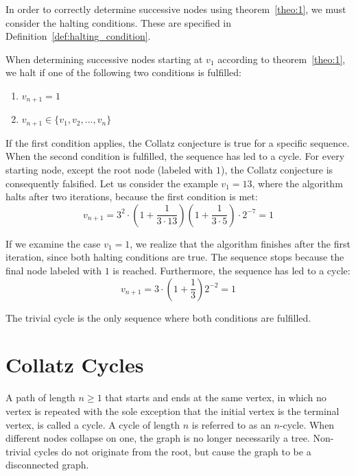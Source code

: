 \documentclass{SciPress_2015}
\begin{document}
In order to correctly determine successive nodes using theorem~\ref{theo:1}, we must consider the halting conditions. These are specified in Definition~\ref{def:halting_condition}.

\begin{definition}
	\label{def:halting_condition}
	When determining successive nodes starting at $v_1$ according to theorem~\ref{theo:1}, we halt if one of the following two conditions is fulfilled:
	\begin{enumerate}
		\item $v_{n+1}=1$
		\item $v_{n+1}\in\{v_1,v_2,\ldots,v_n\}$
	\end{enumerate}
	If the first condition applies, the Collatz conjecture is true for a specific sequence. When the second condition is fulfilled, the sequence has led to a cycle. For every starting node, except the root node (labeled with $1$), the Collatz conjecture is consequently falsified. Let us consider the example $v_1=13$, where the algorithm halts after two iterations, because the first condition is met:
	\[
	v_{n+1}=3^2\cdot\left(1+\frac{1}{3\cdot13}\right)\left(1+\frac{1}{3\cdot5}\right)\cdot2^{-7}=1
	\]
	
	If we examine the case $v_{1}=1$, we realize that the algorithm finishes after the first iteration, since both halting conditions are true. The sequence stops because the final node labeled with $1$ is reached. Furthermore, the sequence has led to a cycle:
	\[
	v_{n+1}=3\cdot\left(1+\frac{1}{3}\right)2^{-2}=1
	\]
	
	The trivial cycle is the only sequence where both conditions are fulfilled.
\end{definition}

\section{Collatz Cycles}
A path of length $n\geq 1$ that starts and ends at the same vertex, in which no vertex is repeated with the sole exception that the initial vertex is the terminal vertex, is called a cycle. A cycle of length $n$ is referred to as an $n$-cycle. When different nodes collapse on one, the graph is no longer necessarily a tree. Non-trivial cycles do not originate from the root, but cause the graph to be a disconnected graph.
\end{document}
